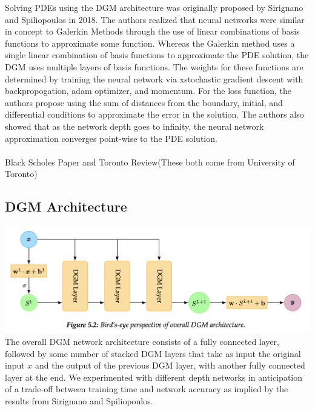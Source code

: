 \documentclass{article}
\begin{document}
Solving PDEs using the DGM architecture was originally proposed by Sirignano and Spiliopoulos in 2018. The authors realized that neural networks were similar in concept to Galerkin Methods through the use of linear combinations of basis functions to approximate some function. Whereas the Galerkin method uses a single linear combination of basis functions to approximate the PDE solution, the DGM uses multiple layers of basis functions. The weights for these functions are determined by training the neural network via xstochastic gradient descent with backpropogation, adam optimizer, and momentum. For the loss function, the authors propose using the sum of distances from the boundary, initial, and differential conditions to approximate the error in the solution.
The authors also showed that as the network depth goes to infinity, the neural network approximation converges point-wise to the PDE solution.\\ \\

Black Scholes Paper and Toronto Review(These both come from University of Toronto)

\subsection{ DGM Architecture }
\includegraphics[scale=0.32]{Architecture.png}\\
The overall DGM network architecture consists of a fully connected layer, followed by some number of stacked DGM layers that take as input the original input $x$ and the output of the previous DGM layer, with another fully connected layer at the end. We experimented with different depth networks in anticipation of a trade-off between training time and network accuracy as implied by the results from Sirignano and Spiliopoulos.
\end{document}
